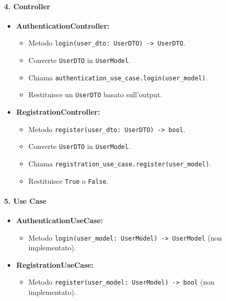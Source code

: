     \paragraph{4. Controller}
    \begin{itemize}
        \item \textbf{AuthenticationController:}
        \begin{itemize}
            \item Metodo \texttt{login(user\_dto: UserDTO) -> UserDTO}.
            \item Converte \texttt{UserDTO} in \texttt{UserModel}.
            \item Chiama \texttt{authentication\_use\_case.login(user\_model)}.
            \item Restituisce un \texttt{UserDTO} basato sull'output.
        \end{itemize}
        \item \textbf{RegistrationController:}
        \begin{itemize}
            \item Metodo \texttt{register(user\_dto: UserDTO) -> bool}.
            \item Converte \texttt{UserDTO} in \texttt{UserModel}.
            \item Chiama \texttt{registration\_use\_case.register(user\_model)}.
            \item Restituisce \texttt{True} o \texttt{False}.
        \end{itemize}
    \end{itemize}

    \paragraph{5. Use Case}
    \begin{itemize}
        \item \textbf{AuthenticationUseCase:}
        \begin{itemize}
            \item Metodo \texttt{login(user\_model: UserModel) -> UserModel} (non implementato).
        \end{itemize}
        \item \textbf{RegistrationUseCase:}
        \begin{itemize}
            \item Metodo \texttt{register(user\_model: UserModel) -> bool} (non implementato).
        \end{itemize}
    \end{itemize}

